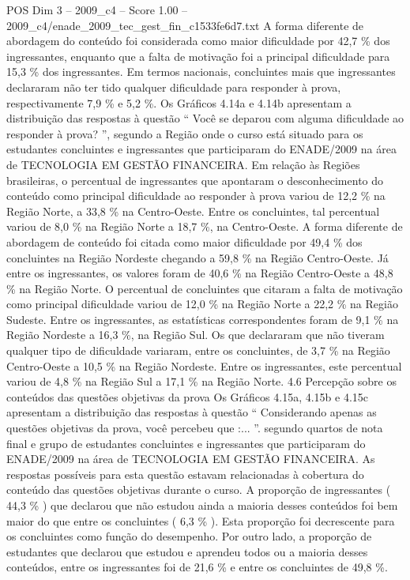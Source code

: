 \begin{textsample}{POS Dim 3 – 2009\_c4 – Score 1.00 – 2009\_c4/enade\_2009\_tec\_gest\_fin\_c1533fe6d7.txt}
A forma diferente de abordagem do conteúdo foi considerada como maior dificuldade por 42,7 \% dos ingressantes, enquanto que a falta de motivação foi a principal dificuldade para 15,3 \% dos ingressantes.
Em termos nacionais, concluintes mais que ingressantes declararam não ter tido qualquer dificuldade para responder à prova, respectivamente 7,9 \% e 5,2 \%.
Os Gráficos 4.14a e 4.14b apresentam a distribuição das respostas à questão “ Você se deparou com alguma dificuldade ao responder à prova? ”, segundo a Região onde o curso está situado para os estudantes concluintes e ingressantes que participaram do ENADE/2009 na área de TECNOLOGIA EM GESTÃO FINANCEIRA.
Em relação às Regiões brasileiras, o percentual de ingressantes que apontaram o desconhecimento do conteúdo como principal dificuldade ao responder à prova variou de 12,2 \% na Região Norte, a 33,8 \% na Centro-Oeste.
Entre os concluintes, tal percentual variou de 8,0 \% na Região Norte a 18,7 \%, na Centro-Oeste.
A forma diferente de abordagem de conteúdo foi citada como maior dificuldade por 49,4 \% dos concluintes na Região Nordeste chegando a 59,8 \% na Região Centro-Oeste.
Já entre os ingressantes, os valores foram de 40,6 \% na Região Centro-Oeste a 48,8 \% na Região Norte.
O percentual de concluintes que citaram a falta de motivação como principal dificuldade variou de 12,0 \% na Região Norte a 22,2 \% na Região Sudeste.
Entre os ingressantes, as estatísticas correspondentes foram de 9,1 \% na Região Nordeste a 16,3 \%, na Região Sul.
Os que declararam que não tiveram qualquer tipo de dificuldade variaram, entre os concluintes, de 3,7 \% na Região Centro-Oeste a 10,5 \% na Região Nordeste.
Entre os ingressantes, este percentual variou de 4,8 \% na Região Sul a 17,1 \% na Região Norte. 4.6 Percepção sobre os conteúdos das questões objetivas da prova Os Gráficos 4.15a, 4.15b e 4.15c apresentam a distribuição das respostas à questão “ Considerando apenas as questões objetivas da prova, você percebeu que :... ”. segundo quartos de nota final e grupo de estudantes concluintes e ingressantes que participaram do ENADE/2009 na área de TECNOLOGIA EM GESTÃO FINANCEIRA.
As respostas possíveis para esta questão estavam relacionadas à cobertura do conteúdo das questões objetivas durante o curso.
A proporção de ingressantes ( 44,3 \% ) que declarou que não estudou ainda a maioria desses conteúdos foi bem maior do que entre os concluintes ( 6,3 \% ).
Esta proporção foi decrescente para os concluintes como função do desempenho.
Por outro lado, a proporção de estudantes que declarou que estudou e aprendeu todos ou a maioria desses conteúdos, entre os ingressantes foi de 21,6 \% e entre os concluintes de 49,8 \%.

\end{textsample}
